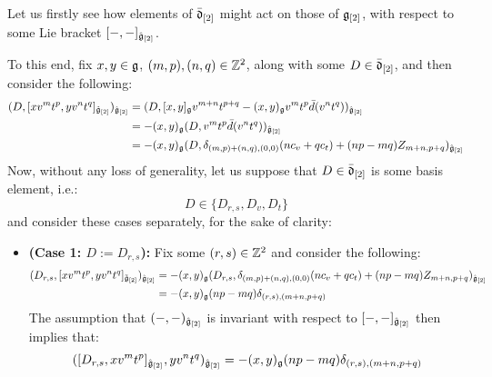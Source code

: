             \begin{remark} \label{remark: derivation_action_on_multiloop_algebras}
                Let us firstly see how elements of $\bar{\mathfrak{d}}_{[2]}$ might act on those of $\mathfrak{g}_{[2]}$, with respect to some Lie bracket $[-, -]_{\hat{\mathfrak{g}}_{[2]}}$. 

                To this end, fix $x, y \in \mathfrak{g}$, $(m, p), (n, q) \in \mathbb{Z}^2$, along with some $D \in \bar{\mathfrak{d}}_{[2]}$, and then consider the following:
                    $$
                        \begin{aligned}
                            ( D, [x v^m t^p, y v^n t^q]_{\tilde{\mathfrak{g}}_{[2]}} )_{\hat{\mathfrak{g}}_{[2]}} & = ( D, [x, y]_{\mathfrak{g}} v^{m + n} t^{p + q} - (x, y)_{\mathfrak{g}} v^m t^p \bar{d}( v^n t^q ) )_{\hat{\mathfrak{g}}_{[2]}}
                            \\
                            & = -(x, y)_{\mathfrak{g}} ( D, v^m t^p \bar{d}( v^n t^q ) )_{\hat{\mathfrak{g}}_{[2]}}
                            \\
                            & = -(x, y)_{\mathfrak{g}} ( D, \delta_{(m, p) + (n, q), (0, 0)} ( n c_v + q c_t ) + (np - mq) Z_{m + n, p + q} )_{\hat{\mathfrak{g}}_{[2]}}
                        \end{aligned}
                    $$
                Now, without any loss of generality, let us suppose that $D \in \bar{\mathfrak{d}}_{[2]}$ is some basis element, i.e.:
                    $$D \in \{ D_{r, s}, D_v, D_t \}$$
                and consider these cases separately, for the sake of clarity:
                \begin{itemize}
                    \item \textbf{(Case 1: $D := D_{r, s}$):} Fix some $(r, s) \in \mathbb{Z}^2$ and consider the following:
                        $$
                            \begin{aligned}
                                ( D_{r, s}, [x v^m t^p, y v^n t^q]_{\tilde{\mathfrak{g}}_{[2]}} )_{\hat{\mathfrak{g}}_{[2]}} & = -(x, y)_{\mathfrak{g}} ( D_{r, s}, \delta_{(m, p) + (n, q), (0, 0)} ( n c_v + q c_t ) + (np - mq) Z_{m + n, p + q} )_{\hat{\mathfrak{g}}_{[2]}}
                                \\
                                & = -(x, y)_{\mathfrak{g}} (np - mq) \delta_{(r, s), (m + n, p + q)}
                            \end{aligned}
                        $$
                    The assumption that $(-, -)_{\hat{\mathfrak{g}}_{[2]}}$ is invariant with respect to $[-, -]_{\hat{\mathfrak{g}}_{[2]}}$ then implies that:
                        $$( [D_{r, s}, x v^m t^p]_{\hat{\mathfrak{g}}_{[2]}}, y v^n t^q )_{\hat{\mathfrak{g}}_{[2]}} = -(x, y)_{\mathfrak{g}} (np - mq) \delta_{(r, s), (m + n, p + q)}$$

\end{itemize}
\end{remark}
